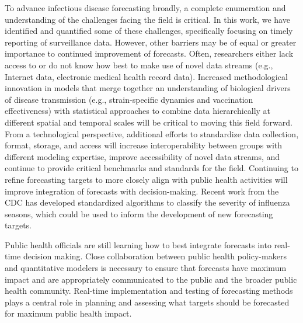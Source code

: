 \documentclass[9pt,twocolumn,twoside]{pnas-new}\usepackage[]{graphicx}\usepackage[]{color}
\begin{document}
To advance infectious disease forecasting broadly, a complete enumeration and understanding of the challenges facing the field is critical.
In this work, we have identified and quantified some of these challenges, specifically focusing on timely reporting of surveillance data. 
However, other barriers may be of equal or greater importance to continued improvement of forecasts.
Often, researchers either lack access to or do not know how best to make use of novel data streams (e.g., Internet data, electronic medical health record data). 
Increased methodological innovation in models that merge together an understanding of biological drivers of disease transmission (e.g., strain-specific dynamics and vaccination effectiveness) with statistical approaches to combine data hierarchically at different spatial and temporal scales will be critical to moving this field forward.
From a technological perspective, additional efforts to standardize data collection, format, storage, and access will increase interoperability between groups with different modeling expertise, improve accessibility of novel data streams, and continue to provide critical benchmarks and standards for the field.
Continuing to refine forecasting targets to more closely align with public health activities will improve integration of forecasts with decision-making. 
Recent work from the CDC has developed standardized algorithms to classify the severity of influenza seasons\cite{biggerstaff2018systematic}, which could be used to inform the development of new forecasting targets.

Public health officials are still learning how to best integrate forecasts into real-time decision making.
Close collaboration between public health policy-makers and quantitative modelers is necessary to ensure that forecasts have maximum impact and are appropriately communicated to the public and the broader public health community.  
Real-time implementation and testing of forecasting methods plays a central role in planning and assessing what targets should be forecasted for maximum public health impact.
\end{document}
